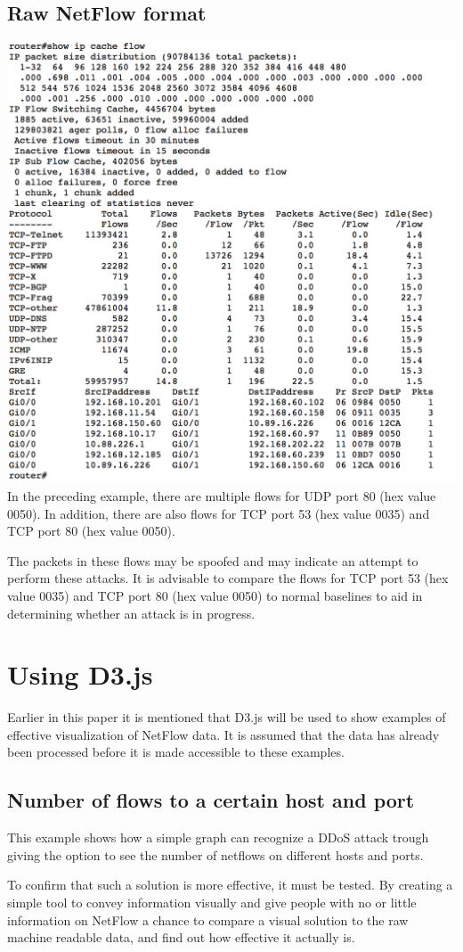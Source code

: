 \subsection{Raw NetFlow format}
\includegraphics[scale=0.4]{netflow_ddos}
In the preceding example, there are multiple flows for UDP port 80 (hex value 0050). In addition, there are also flows for TCP port 53 (hex value 0035) and TCP port 80 (hex value 0050).

The packets in these flows may be spoofed and may indicate an attempt to perform these attacks. It is advisable to compare the flows for TCP port 53 (hex value 0035) and TCP port 80 (hex value 0050) to normal baselines to aid in determining whether an attack is in progress.



\section{Using D3.js}
Earlier in this paper it is mentioned that D3.js will be used to show examples of effective visualization of NetFlow data. It is assumed that the data has already been processed before it is made accessible to these examples. 

\subsection{Number of flows to a certain host and port}
This example shows how a simple graph can recognize a DDoS attack trough giving the option to see the number of netflows on different hosts and ports. 


To confirm that such a solution is more effective, it must be tested. By creating a simple tool to convey information visually and give people with no or little information on NetFlow a chance to compare a visual solution to the raw machine readable data, and find out how effective it actually is.  

